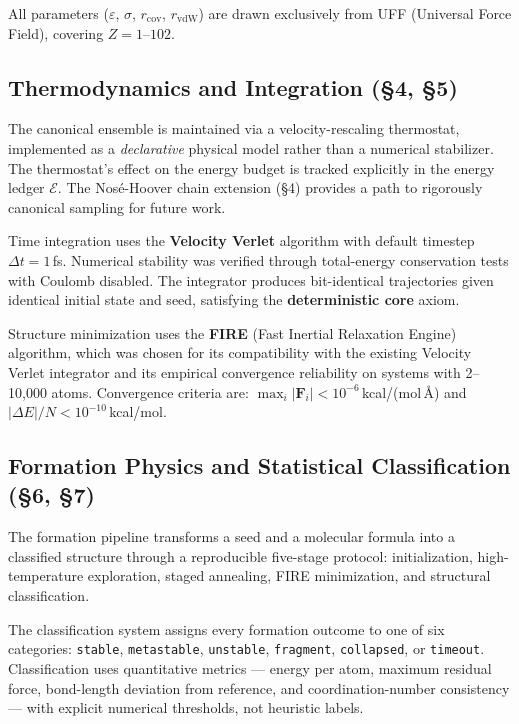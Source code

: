 \documentclass[11pt]{article}
\begin{document}
All parameters ($\varepsilon$, $\sigma$, $r_{\mathrm{cov}}$, $r_{\mathrm{vdW}}$)
are drawn exclusively from UFF (Universal Force Field), covering
$Z = 1$--$102$.

\subsection{Thermodynamics and Integration (\S4, \S5)}

The canonical ensemble is maintained via a velocity-rescaling
thermostat, implemented as a \textit{declarative} physical model
rather than a numerical stabilizer.  The thermostat's effect on
the energy budget is tracked explicitly in the energy ledger
$\mathcal{E}$.  The Nos\'e-Hoover chain extension (\S4) provides
a path to rigorously canonical sampling for future work.

Time integration uses the \textbf{Velocity Verlet} algorithm with
default timestep $\Delta t = 1$\,fs.  Numerical stability was
verified through total-energy conservation tests with Coulomb
disabled.  The integrator produces bit-identical trajectories
given identical initial state and seed, satisfying the
\textbf{deterministic core} axiom.

Structure minimization uses the \textbf{FIRE} (Fast Inertial
Relaxation Engine) algorithm, which was chosen for its compatibility
with the existing Velocity Verlet integrator and its empirical
convergence reliability on systems with 2--10,000 atoms.
Convergence criteria are:
$\max_i |\mathbf{F}_i| < 10^{-6}$\,kcal/(mol\,\AA) and
$|\Delta E|/N < 10^{-10}$\,kcal/mol.

\subsection{Formation Physics and Statistical Classification (\S6, \S7)}

The formation pipeline transforms a seed and a molecular formula
into a classified structure through a reproducible five-stage
protocol: initialization, high-temperature exploration, staged
annealing, FIRE minimization, and structural classification.

The classification system assigns every formation outcome to one
of six categories: \texttt{stable}, \texttt{metastable},
\texttt{unstable}, \texttt{fragment}, \texttt{collapsed},
or \texttt{timeout}.  Classification uses quantitative metrics ---
energy per atom, maximum residual force, bond-length deviation
from reference, and coordination-number consistency --- with
explicit numerical thresholds, not heuristic labels.
\end{document}
